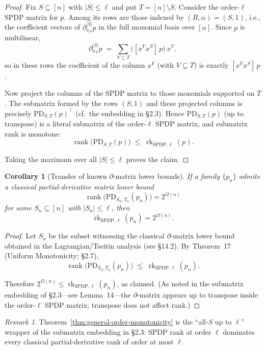 \documentclass[12pt]{article}
\newtheorem{corollary}[theorem]{Corollary}
\theoremstyle{definition}
\theoremstyle{definition}
\theoremstyle{remark}
\newtheorem{remark}{Remark}
\theoremstyle{remark}
\begin{document}
\begin{proof}
Fix $S \subseteq [n]$ with $|S| \leq \ell$ and put $T = [n] \setminus S$. Consider the order-$\ell$ SPDP matrix for $p$. Among its rows are those indexed by $(R,\alpha) = (S,1)$, i.e., the coefficient vectors of $\partial^{|S|}_{x_S} p$ in the full monomial basis over $[n]$. Since $p$ is multilinear,
\[
\partial^{|S|}_{x_S} p \;=\; \sum_{V \subseteq T} \bigl([x^V x^S]\, p\bigr)\, x^V,
\]
so in these rows the coefficient of the column $x^V$ (with $V \subseteq T$) is exactly $[x^V x^S]\, p$.

Now project the columns of the SPDP matrix to those monomials supported on $T$. The submatrix formed by the rows $(S,1)$ and these projected columns is precisely $\mathrm{PD}_{S,T}(p)^\top$ (cf.\ the embedding in \S2.3). Hence $\mathrm{PD}_{S,T}(p)$ (up to transpose) is a literal submatrix of the order-$\ell$ SPDP matrix, and submatrix rank is monotone:
\[
\operatorname{rank}\!\bigl(\mathrm{PD}_{S,T}(p)\bigr) \;\le\; \operatorname{rk}_{\mathrm{SPDP},\ell}(p).
\]

Taking the maximum over all $|S| \leq \ell$ proves the claim.
\end{proof}

\begin{corollary}[Transfer of known $\partial$-matrix lower bounds]\label{cor:transfer-partial-derivative}
If a family $\{p_n\}$ admits a classical partial-derivative matrix lower bound
\[
\operatorname{rank}\!\bigl(\mathrm{PD}_{S_n,T_n}(p_n)\bigr) = 2^{\Omega(n)}
\]
for some $S_n \subseteq [n]$ with $|S_n| \leq \ell$, then
\[
\operatorname{rk}_{\mathrm{SPDP},\ell}(p_n) = 2^{\Omega(n)}.
\]
\end{corollary}

\begin{proof}
Let $S_n$ be the subset witnessing the classical $\partial$-matrix lower bound obtained in the Lagrangian/Tseitin analysis (see \S14.2). By Theorem~17 (Uniform Monotonicity; \S2.7),
\[
\operatorname{rank}\!\bigl(\mathrm{PD}_{S_n,T_n}(p_n)\bigr) \;\le\; \operatorname{rk}_{\mathrm{SPDP},\ell}(p_n).
\]

Therefore $2^{\Omega(n)} \le \operatorname{rk}_{\mathrm{SPDP},\ell}(p_n)$, as claimed. (As noted in the submatrix embedding of \S2.3---see Lemma~14---the $\partial$-matrix appears up to transpose inside the order-$\ell$ SPDP matrix; transpose does not affect rank.)
\end{proof}

\begin{remark}
Theorem~\ref{thm:general-order-monotonicity} is the ``all-$S$ up to $\ell$'' wrapper of the submatrix embedding in \S2.3: SPDP rank at order $\ell$ dominates every classical partial-derivative rank of order at most $\ell$.
\end{remark}
\end{document}
